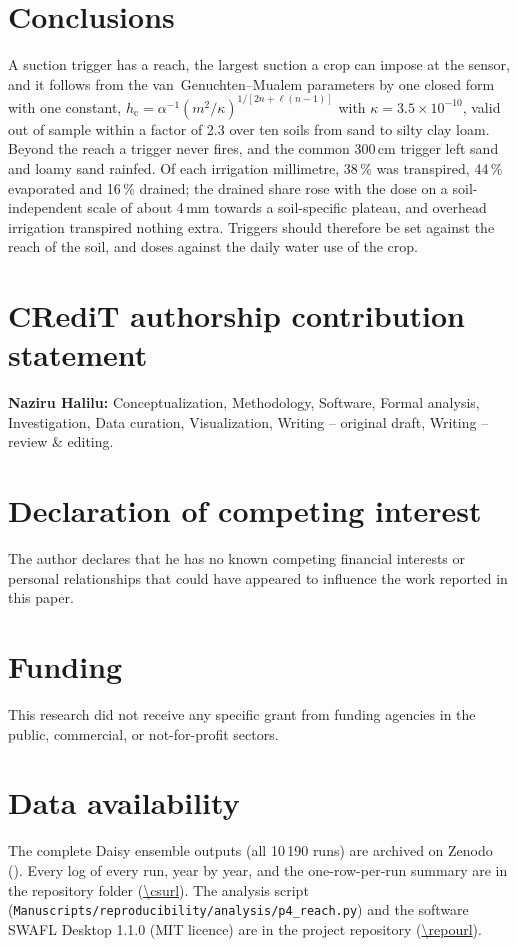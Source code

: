 \documentclass[review,12pt,authoryear]{elsarticle}
\newcommand{\hc}{h_{\mathrm{c}}}
\begin{document}
\section{Conclusions}
A suction trigger has a reach, the largest suction a crop can impose at the sensor, and it follows from the van~Genuchten--Mualem parameters by one closed form with one constant, $\hc=\alpha^{-1}(m^{2}/\kappa)^{1/[2n+\ell(n-1)]}$ with $\kappa=3.5\times10^{-10}$, valid out of sample within a factor of 2.3 over ten soils from sand to silty clay loam. Beyond the reach a trigger never fires, and the common 300\,cm trigger left sand and loamy sand rainfed. Of each irrigation millimetre, 38\,\% was transpired, 44\,\% evaporated and 16\,\% drained; the drained share rose with the dose on a soil-independent scale of about 4\,mm towards a soil-specific plateau, and overhead irrigation transpired nothing extra. Triggers should therefore be set against the reach of the soil, and doses against the daily water use of the crop.

\section*{CRediT authorship contribution statement}
\textbf{Naziru Halilu:} Conceptualization, Methodology, Software, Formal analysis, Investigation, Data curation, Visualization, Writing -- original draft, Writing -- review \& editing.

\section*{Declaration of competing interest}
The author declares that he has no known competing financial interests or personal relationships that could have appeared to influence the work reported in this paper.

\section*{Funding}
This research did not receive any specific grant from funding agencies in the public, commercial, or not-for-profit sectors.

\section*{Data availability}
The complete Daisy ensemble outputs (all 10\,190 runs) are archived on Zenodo (). Every log of every run, year by year, and the one-row-per-run summary are in the repository folder \cslink{} (\url{\csurl}). The analysis script (\texttt{Manuscripts/reproducibility/analysis/p4\_reach.py}) and the software SWAFL Desktop 1.1.0 (MIT licence) are in the project repository (\url{\repourl}).
\end{document}

